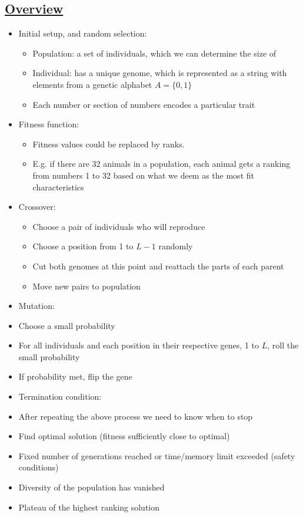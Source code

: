 \newpage
\subsection{\underline{Overview}}

\begin{itemize}
\item Initial setup, and random selection:
\begin{itemize}
\item Population: a set of individuals, which we can determine the size of
\item Individual: has a unique genome, which is represented as a string with elements from a genetic alphabet $A=\{0,1\}$
\item Each number or section of numbers encodes a particular trait
\end{itemize}
\item Fitness function:
\begin{itemize}
\item Fitness values could be replaced by ranks.
\item E.g. if there are 32 animals in a population, each animal gets a ranking from numbers 1 to 32 based on what we deem as the most fit characteristics
\end{itemize}
\item Crossover:
\begin{itemize}
    \item Choose a pair of individuals who will reproduce
    \item Choose a position from 1 to $L - 1$ randomly
    \item Cut both genomes at this point and reattach the parts of each parent
    \item Move new pairs to population
\end{itemize}
\item Mutation:
\bi
    \item Choose a small probability
    \item For all individuals and each position in their respective genes,
    1 to $L$, roll the small probability
    \item If probability met, flip the gene
\ei
\item Termination condition:
\bi 
    \item After repeating the above process we need to know when to stop
    \item Find optimal solution (fitness sufficiently close to optimal)
    \item Fixed number of generations reached or time/memory limit exceeded
    (safety conditions)
    \item Diversity of the population has vanished
    \item Plateau of the highest ranking solution
\ei
\end{itemize}